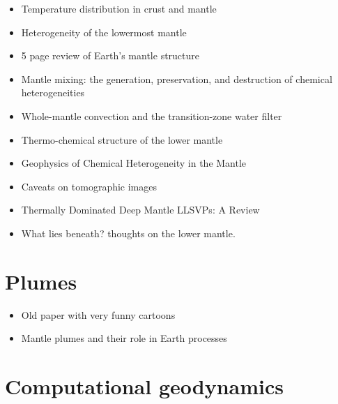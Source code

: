    \begin{itemize}
   \item [\nineteeneightysix] Temperature distribution in crust and mantle \cite{jemo86}
   \item [\twothousand] Heterogeneity of the lowermost mantle \cite{garn00}
   \item [\twothousandone] 5 page review of Earth's mantle structure \cite{hewo01}
   \item [\twothousandtwo] Mantle mixing: the generation, preservation, and destruction of chemical heterogeneities \cite{vahb02}
   \item [\twothousandthree] Whole-mantle convection and the transition-zone water filter \cite{beka03}
   \item [\twothousandseven] Thermo-chemical structure of the lower mantle \cite{dett07}
   \item [\twothousandtwelve] Geophysics of Chemical Heterogeneity in the Mantle \cite{stli12}
   \item [\twothousandthirteen] Caveats on tomographic images \cite{fopa13}
   \item [\twothousandfifteen] Thermally Dominated Deep Mantle LLSVPs: A Review \cite{dagl15}
   \item [\twothousandnineteen] What lies beneath? thoughts on the lower mantle. \cite{hega19}
   \end{itemize}


\section{Plumes}

   \begin{itemize}
   \item[\nineteenseventyseven] Old paper with very funny cartoons \cite{hovo77}
   \item[\twothousandtwentyone] Mantle plumes and their role in Earth processes \cite{kobj21}
   \end{itemize}


\section{Computational geodynamics}

